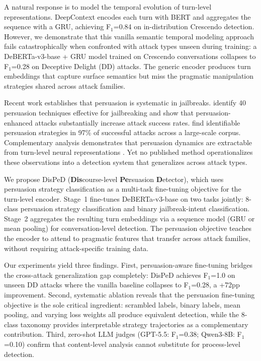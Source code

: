 \documentclass[11pt,a4paper]{article}
\newcommand{\ours}{DisPeD}
\newcommand{\fone}{F$_1$}
\begin{document}
A natural response is to model the temporal evolution of turn-level representations.
DeepContext \citep{su2026} encodes each turn with BERT and aggregates the sequence with a GRU, achieving \fone{}=0.84 on in-distribution Crescendo detection.
However, we demonstrate that this vanilla semantic temporal modeling approach fails catastrophically when confronted with attack types unseen during training: a DeBERTa-v3-base + GRU model trained on Crescendo conversations collapses to \fone{}=0.28 on Deceptive Delight (DD) attacks.
The generic encoder produces turn embeddings that capture surface semantics but miss the pragmatic manipulation strategies shared across attack families.

Recent work establishes that persuasion is systematic in jailbreaks.
\citet{zeng2024pap} identify 40 persuasion techniques effective for jailbreaking and show that persuasion-enhanced attacks substantially increase attack success rates.
\citet{hagendorff2026} find identifiable persuasion strategies in 97\% of successful attacks across a large-scale corpus.
Complementary analysis demonstrates that persuasion dynamics are extractable from turn-level neural representations \citep{howdollms2025}.
Yet no published method operationalizes these observations into a detection system that generalizes across attack types.

We propose \ours{} (\textbf{Dis}course-level \textbf{Pe}rsuasion \textbf{D}etector), which uses persuasion strategy classification as a multi-task fine-tuning objective for the turn-level encoder.
Stage~1 fine-tunes DeBERTa-v3-base on two tasks jointly: 8-class persuasion strategy classification and binary jailbreak-intent classification.
Stage~2 aggregates the resulting turn embeddings via a sequence model (GRU or mean pooling) for conversation-level detection.
The persuasion objective teaches the encoder to attend to pragmatic features that transfer across attack families, without requiring attack-specific training data.

Our experiments yield three findings.
First, persuasion-aware fine-tuning bridges the cross-attack generalization gap completely: \ours{} achieves \fone{}=1.0 on unseen DD attacks where the vanilla baseline collapses to \fone{}=0.28, a +72pp improvement.
Second, systematic ablation reveals that the persuasion fine-tuning objective is the sole critical ingredient: scrambled labels, binary labels, mean pooling, and varying loss weights all produce equivalent detection, while the 8-class taxonomy provides interpretable strategy trajectories as a complementary contribution.
Third, zero-shot LLM judges (GPT-5.5: \fone{}=0.38; Qwen3-8B: \fone{}=0.10) confirm that content-level analysis cannot substitute for process-level detection.
\end{document}
